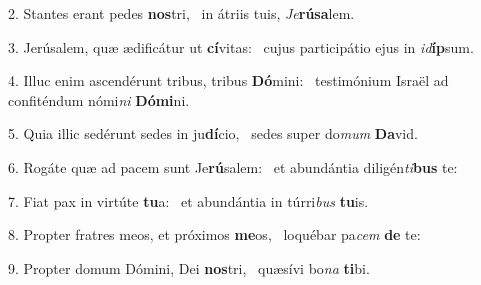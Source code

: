 2. Stantes erant pedes \textbf{nos}tri, \ast\  in átriis tuis, \textit{Je}\textbf{rú}\textbf{sa}lem.\

3. Jerúsalem, quæ ædificátur ut \textbf{cí}vitas: \ast\  cujus participátio ejus in \textit{id}\textbf{íp}sum.\

4. Illuc enim ascendérunt tribus, tribus \textbf{Dó}mini: \ast\  testimónium Israël ad confiténdum nómi\textit{ni} \textbf{Dó}\textbf{mi}ni.\

5. Quia illic sedérunt sedes in ju\textbf{dí}cio, \ast\  sedes super do\textit{mum} \textbf{Da}vid.\

6. Rogáte quæ ad pacem sunt Je\textbf{rú}salem: \ast\  et abundántia diligén\textit{ti}\textbf{bus} te:\

7. Fiat pax in virtúte \textbf{tu}a: \ast\  et abundántia in túrri\textit{bus} \textbf{tu}is.\

8. Propter fratres meos, et próximos \textbf{me}os, \ast\  loquébar pa\textit{cem} \textbf{de} te:\

9. Propter domum Dómini, Dei \textbf{nos}tri, \ast\  quæsívi bo\textit{na} \textbf{ti}bi.\

